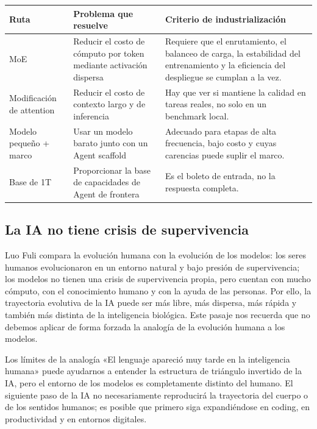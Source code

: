 \noindent\begin{tabularx}{\textwidth}{p{}p{}X}
\toprule
Ruta & Problema que resuelve & Criterio de industrialización \\
\midrule
MoE & Reducir el costo de cómputo por token mediante activación dispersa & Requiere que el enrutamiento, el balanceo de carga, la estabilidad del entrenamiento y la eficiencia del despliegue se cumplan a la vez. \\
Modificación de attention & Reducir el costo de contexto largo y de inferencia & Hay que ver si mantiene la calidad en tareas reales, no solo en un benchmark local. \\
Modelo pequeño + marco & Usar un modelo barato junto con un Agent scaffold & Adecuado para etapas de alta frecuencia, bajo costo y cuyas carencias puede suplir el marco. \\
Base de 1T & Proporcionar la base de capacidades de Agent de frontera & Es el boleto de entrada, no la respuesta completa. \\
\bottomrule
\end{tabularx}

\subsection{La IA no tiene crisis de supervivencia}

Luo Fuli compara la evolución humana con la evolución de los modelos: los seres humanos evolucionaron en un entorno natural y bajo presión de supervivencia; los modelos no tienen una crisis de supervivencia propia, pero cuentan con mucho cómputo, con el conocimiento humano y con la ayuda de las personas. Por ello, la trayectoria evolutiva de la IA puede ser más libre, más dispersa, más rápida y también más distinta de la inteligencia biológica. Este pasaje nos recuerda que no debemos aplicar de forma forzada la analogía de la evolución humana a los modelos.

\begin{knowledgebox}{Los límites de la analogía}
«El lenguaje apareció muy tarde en la inteligencia humana» puede ayudarnos a entender la estructura de triángulo invertido de la IA, pero el entorno de los modelos es completamente distinto del humano. El siguiente paso de la IA no necesariamente reproducirá la trayectoria del cuerpo o de los sentidos humanos; es posible que primero siga expandiéndose en coding, en productividad y en entornos digitales.
\end{knowledgebox}

